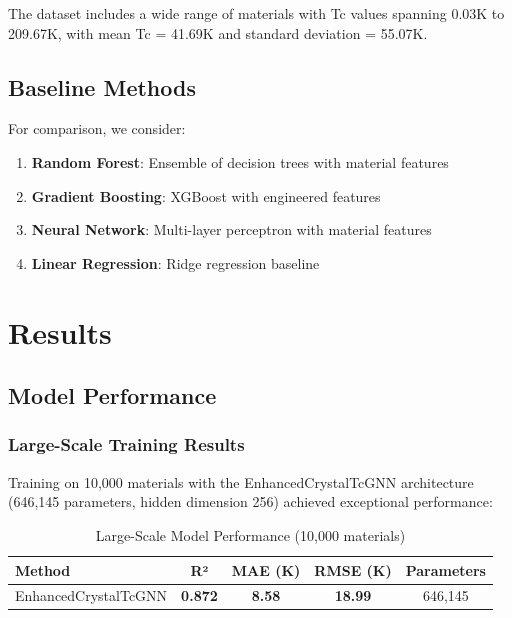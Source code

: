 \documentclass[11pt,a4paper]{article}
\begin{document}
The dataset includes a wide range of materials with Tc values spanning 0.03K to 209.67K, with mean Tc = 41.69K and standard deviation = 55.07K.

\subsection{Baseline Methods}

For comparison, we consider:

\begin{enumerate}
    \item \textbf{Random Forest}: Ensemble of decision trees with material features
    \item \textbf{Gradient Boosting}: XGBoost with engineered features
    \item \textbf{Neural Network}: Multi-layer perceptron with material features
    \item \textbf{Linear Regression}: Ridge regression baseline
\end{enumerate}

\section{Results}

\subsection{Model Performance}

\subsubsection{Large-Scale Training Results}

Training on 10,000 materials with the EnhancedCrystalTcGNN architecture (646,145 parameters, hidden dimension 256) achieved exceptional performance:

\begin{table}[H]
\centering
\caption{Large-Scale Model Performance (10,000 materials)}
\begin{tabular}{@{}lcccc@{}}
\toprule
\textbf{Method} & \textbf{R²} & \textbf{MAE (K)} & \textbf{RMSE (K)} & \textbf{Parameters} \\
\midrule
EnhancedCrystalTcGNN & \textbf{0.872} & \textbf{8.58} & \textbf{18.99} & 646,145 \\
\bottomrule
\end{tabular}
\end{table}
\end{document}

